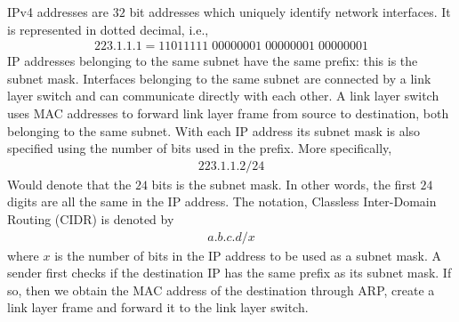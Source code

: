 \documentclass[a4paper]{article}
\theoremstyle{plain}
\theoremstyle{definition}
\newtheorem{defn}{Definition}[section]
\theoremstyle{remark}
\begin{document}
\begin{tcolorbox}[colback=black!3!white,colframe=black!60!white,title=\begin{defn}IP addressing and subnets \label{IP addressing and subnets}\end{defn}]
IPv4 addresses are $32$ bit addresses which uniquely identify network interfaces. It is represented in dotted decimal, i.e.,
\begin{align*}
	223.1.1.1 = 11011111 \; 00000001 \; 00000001 \; 00000001
\end{align*}
IP addresses belonging to the same subnet have the same prefix: this is the subnet mask. Interfaces belonging to the same subnet are connected by a link layer switch and can communicate directly with each other. A link layer switch uses MAC addresses to forward link layer frame from source to destination, both belonging to the same subnet. With each IP address its subnet mask is also specified using the number of bits used in the prefix. More specifically,
\begin{align*}
	223.1.1.2/24
\end{align*}
Would denote that the $24$ bits is the subnet mask. In other words, the first $24$ digits are all the same in the IP address. The notation, Classless Inter-Domain Routing (CIDR) is denoted by
\begin{align*}
	a.b.c.d/x
\end{align*}
where $x$ is the number of bits in the IP address to be used as a subnet mask. A sender first checks if the destination IP has the same prefix as its subnet mask. If so, then we obtain the MAC address of the destination through ARP, create a link layer frame and forward it to the link layer switch.
\end{tcolorbox}
\end{document}
